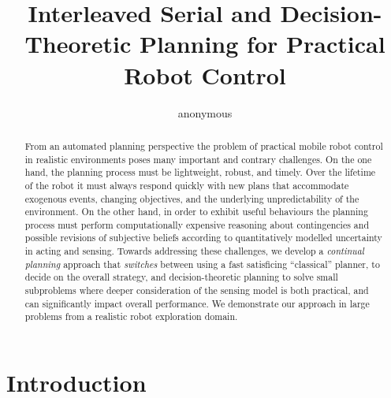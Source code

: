 \documentclass{article}
\title{Interleaved Serial and Decision-Theoretic Planning for
Practical Robot Control}
\author{anonymous}
\begin{document}
\maketitle

\begin{abstract}


From an automated planning perspective the problem of practical mobile
robot control in realistic environments poses many important and
contrary challenges.  On the one hand, the planning process must be
lightweight, robust, and timely. Over the lifetime of the robot it
must always respond quickly with new plans that accommodate exogenous
events, changing objectives, and the underlying unpredictability of
the environment.  On the other hand, in order to exhibit useful
behaviours the planning process must perform computationally expensive
reasoning about contingencies and possible revisions of subjective
beliefs according to quantitatively modelled uncertainty in acting and
sensing.
Towards addressing these challenges, we develop a \emph{continual
planning} approach that {\em switches} between using a fast
satisficing ``classical'' planner, to decide on the overall strategy,
and decision-theoretic planning to solve small subproblems where
deeper consideration of the sensing model is both practical, and can
significantly impact overall performance. We demonstrate our approach
in large problems from a realistic robot exploration domain.







\end{abstract}

\section{Introduction}
\end{document}
